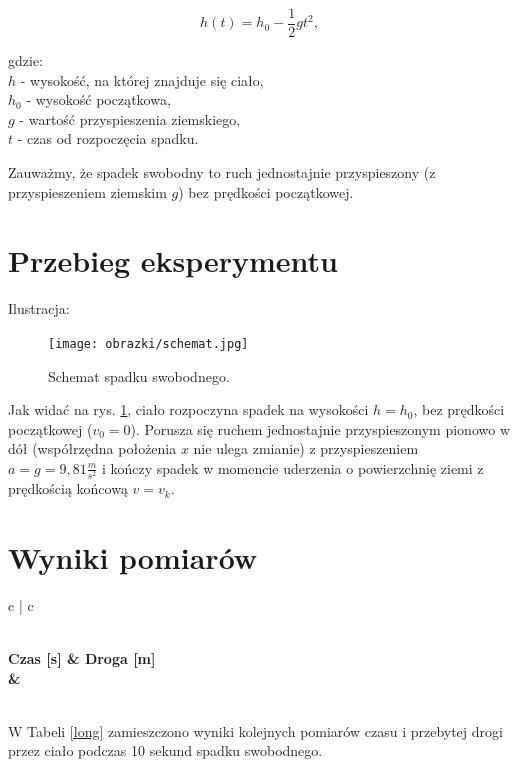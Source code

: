 \documentclass[12pt, a4paper]{article}
\begin{document}
\begin{equation}
    h(t)=h_0-\frac{1}{2}gt^2,
\end{equation}

gdzie:\\
\(h\) - wysokość, na której znajduje się ciało,\\
\(h_0\) - wysokość początkowa,\\
\(g\) - wartość przyspieszenia ziemskiego,\\
\(t\) - czas od rozpoczęcia spadku.

\vspace{1cm}
Zauważmy, że spadek swobodny to ruch jednostajnie przyspieszony (z przyspieszeniem ziemskim $g$) bez prędkości początkowej.

\newpage

\section{Przebieg eksperymentu}

Ilustracja:
\begin{figure}[h]
    \centering
    \texttt{[image: obrazki/schemat.jpg]}
    \caption{Schemat spadku swobodnego.}
    \label{fig:1}
\end{figure}

Jak widać na rys. \ref{fig:1}, ciało rozpoczyna spadek na wysokości $h=h_0$, bez prędkości początkowej ($v_0=0$). Porusza się ruchem jednostajnie przyspieszonym pionowo w dół (współrzędna położenia $x$ nie ulega zmianie) z przyspieszeniem $a=g=9,81 \frac{m}{s^2}$  i kończy spadek w momencie uderzenia o powierzchnię ziemi z prędkością końcową $v=v_k$.

\section{Wyniki pomiarów}

\begin{longtable}[h]{ c | c }
    \caption{Wyniki pomiarów.\label{long}}\\

    \bfseries Czas [s] & \bfseries Droga [m]\\
    \hline
    \endfirsthead
    {\csvcoli & \csvcolii\\}\\
    \hline
\end{longtable}

W Tabeli \ref{long} zamieszczono wyniki kolejnych pomiarów czasu i przebytej drogi przez ciało podczas 10 sekund spadku swobodnego.
\end{document}
